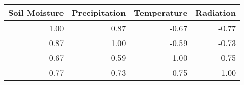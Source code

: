 \begin{tabular}{rrrr}
\toprule
Soil Moisture & Precipitation & Temperature & Radiation \\
\midrule
1.00 & 0.87 & -0.67 & -0.77 \\
0.87 & 1.00 & -0.59 & -0.73 \\
-0.67 & -0.59 & 1.00 & 0.75 \\
-0.77 & -0.73 & 0.75 & 1.00 \\
\bottomrule
\end{tabular}
